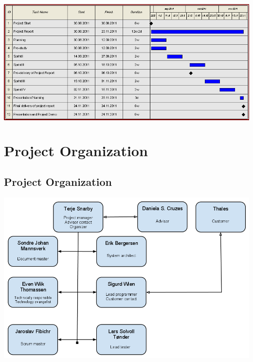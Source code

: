 \includegraphics[scale=0.48]{./planning/img/gantt.png}

\section{Project Organization}

\subsection{Project Organization}

\includegraphics[scale=0.45]{./planning/img/organization.png}

